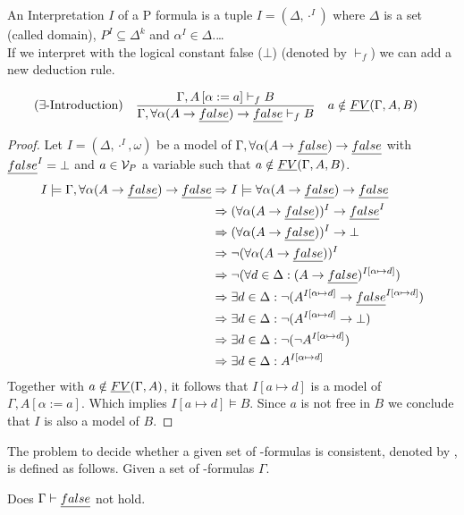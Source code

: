 An Interpretation $I$ of a P formula is a tuple $I=(\Delta,\cdot^I)$ where $\Delta$ is a set (called domain), $P^I\subseteq\Delta^k$ and $\alpha^I\in\Delta$.\dots\\
If we interpret \false{} with the logical constant false ($\bot$) (denoted by $\vdash_f$) we can add a new deduction rule.
\begin{mdframed}
	\begin{align*}
		  & (\exists\text{-Introduction}) &   & \frac 
		{\Gamma,A\left[\alpha:=a\right]\vdash_f B}
		{\Gamma,\forall\alpha(A\to\emph{false})\to\emph{false}\vdash_f B} && a\notin\emph{FV}(\Gamma,A,B)
	\end{align*}
\end{mdframed}
\begin{proof}
	Let $I=(\Delta,\cdot^I,\omega)$ be a model of $\Gamma,\forall\alpha(A\to\emph{false})\to\emph{false}$ with $\emph{false}^I=\bot$ and $a\in\mathcal{V}_P$ a variable such that $a\notin\emph{FV}(\Gamma,A,B)$.
	\begin{align*}
		I\models\Gamma,\forall\alpha(A\to\emph{false})\to\emph{false} & \Rightarrow I\models\forall\alpha(A\to\emph{false})\to\emph{false}                                                          \\
        & \Rightarrow (\forall\alpha(A\to\emph{false}))^I\to\emph{false}^I                                                            \\
        & \Rightarrow (\forall\alpha(A\to\emph{false}))^I\to\bot                                                                \\
        & \Rightarrow \neg(\forall\alpha(A\to\emph{false}))^I                                                                   \\
        & \Rightarrow \neg(\forall d\in\Delta:(A\to\emph{false})^{I\left[\alpha\mapsto d\right]})                               \\
        & \Rightarrow \exists d\in\Delta:\neg(A^{I\left[\alpha\mapsto d\right]}\to\emph{false}^{I\left[\alpha\mapsto d\right]}) \\
        & \Rightarrow \exists d\in\Delta:\neg(A^{I\left[\alpha\mapsto d\right]}\to\bot)                                   \\
        & \Rightarrow \exists d\in\Delta:\neg(\neg A^{I\left[\alpha\mapsto d\right]})                                     \\
        & \Rightarrow \exists d\in\Delta:A^{I\left[\alpha\mapsto d\right]}
	\end{align*}
	Together with $a\notin\emph{FV}(\Gamma,A)$, it follows that $I\left[a\mapsto d\right]$ is a model of $\Gamma,A\left[\alpha:=a\right]$. Which implies $I\left[a\mapsto d\right]\models B$.	Since $a$ is not free in $B$ we conclude that $I$ is also a model of $B$.
\end{proof}
\begin{definition}
	The problem to decide whether a given set of \SysP-formulas is consistent, denoted by \PCons, is defined as follows.
	Given a set of \SysP-formulas $\Gamma$. 
	\begin{center}
		Does $\Gamma\vdash\emph{false}$ not hold.
	\end{center}
\end{definition}
